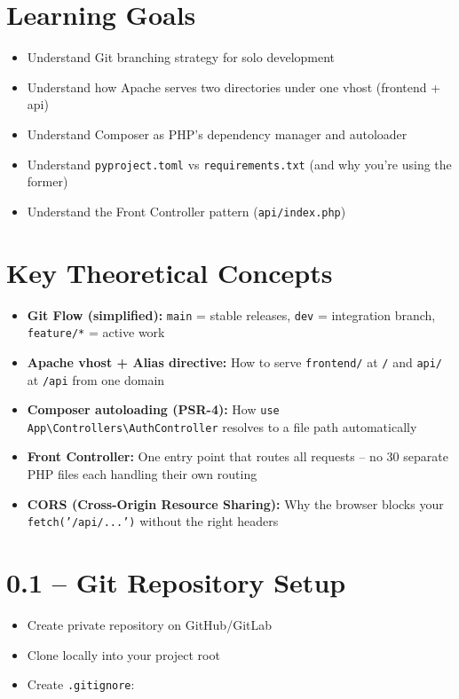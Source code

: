 \documentclass[11pt,a4paper]{report}
\newcommand{\done}{\textcolor{helixteal}{\textbf{[x]}}}
\newcommand{\filepath}[1]{\texttt{\small#1}}
\begin{document}
\section*{Learning Goals}
\begin{itemize}
    \item Understand Git branching strategy for solo development
    \item Understand how Apache serves two directories under one vhost (frontend + api)
    \item Understand Composer as PHP's dependency manager and autoloader
    \item Understand \filepath{pyproject.toml} vs \filepath{requirements.txt} (and why you're using the former)
    \item Understand the Front Controller pattern (\filepath{api/index.php})
\end{itemize}

\section*{Key Theoretical Concepts}
\begin{itemize}
    \item \textbf{Git Flow (simplified):} \texttt{main} = stable releases, \texttt{dev} = integration branch, \texttt{feature/*} = active work
    \item \textbf{Apache vhost + Alias directive:} How to serve \filepath{frontend/} at \texttt{/} and \filepath{api/} at \texttt{/api} from one domain
    \item \textbf{Composer autoloading (PSR-4):} How \texttt{use App\textbackslash Controllers\textbackslash AuthController} resolves to a file path automatically
    \item \textbf{Front Controller:} One entry point that routes all requests -- no 30 separate PHP files each handling their own routing
    \item \textbf{CORS (Cross-Origin Resource Sharing):} Why the browser blocks your \texttt{fetch('/api/...')} without the right headers
\end{itemize}

\section{0.1 -- Git Repository Setup}

\begin{itemize}
    \item[\done] Create private repository on GitHub/GitLab
    \item[\done] Clone locally into your project root
    \item[\done] Create \filepath{.gitignore}:
\end{itemize}
\end{document}
